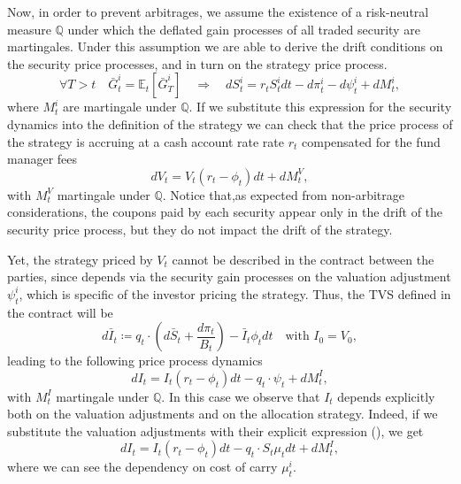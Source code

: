 \documentclass[11pt]{article}
\begin{document}
Now, in order to prevent arbitrages, we assume the existence of a risk-neutral measure $\mathbb{Q}$ under which the deflated gain processes of all traded security are martingales. Under this assumption we are able to derive the drift conditions on the security price processes, and in turn on the strategy price process.
\begin{equation}
    \forall T >t \quad \bar{G}_t^i = \mathbb{E}_t \left[\bar{G}_T^i\right] \quad\Longrightarrow \quad dS_t^i = r_tS_t^idt-d\pi_t^i-d\psi_t^i + dM_t^i,
\label{eq:risk_neutral}\end{equation}
where $M_t^i$ are martingale under $\mathbb{Q}$. If we substitute this expression for the security dynamics into the definition of the strategy we can check that the price process of the strategy is accruing at a cash account rate rate $r_t$ compensated for the fund manager fees
\begin{equation}
    dV_t = V_t(r_t-\phi_t)dt + dM_t^V,
\end{equation}
with $M_t^V$ martingale under $\mathbb{Q}$. Notice that,as expected from non-arbitrage considerations, the coupons paid by each security appear only in the drift of the security price process, but they do not impact the drift of the strategy. 

Yet, the strategy priced by $V_t$ cannot be described in the contract between the parties, since  depends via the security gain processes on the valuation adjustment $\psi_t^i$, which is specific of the investor pricing the strategy. Thus, the TVS defined in the contract will be
\begin{equation}
    d\bar{I}_t \coloneqq q_t \cdot \left(d\bar{S}_t + \frac{d\pi_t}{B_t} \right) - \bar{I}_t\phi_t dt \quad \text{with }I_0 = V_0, 
\label{eq:TVS_first}\end{equation}
leading to the following price process dynamics
\begin{equation}
    dI_t = I_t(r_t-\phi_t)dt -q_t\cdot \psi_t +dM_t^I,
\end{equation}
with $M_t^I$ martingale under $\mathbb{Q}$. In this case we observe that $I_t$ depends explicitly both on the valuation adjustments and on the allocation strategy. Indeed, if we substitute the valuation adjustments with their explicit expression (), we get
\begin{equation}
    dI_t = I_t(r_t-\phi_t)dt - q_t \cdot S_t \mu_t dt + dM_t^I,
\end{equation}
where we can see the dependency on cost of carry $\mu_t^i$.
\end{document}
